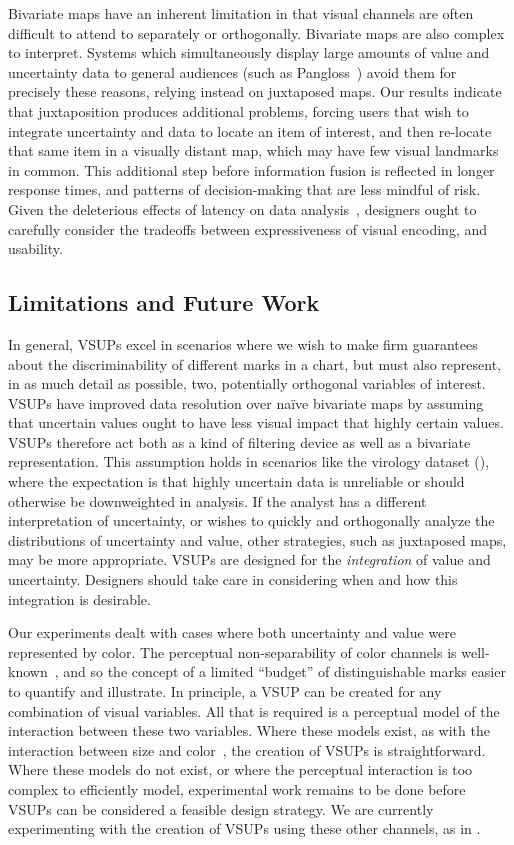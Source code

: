 Bivariate maps have an inherent limitation in that visual channels are often difficult to attend to separately or orthogonally. Bivariate maps are also complex to interpret. Systems which simultaneously display large amounts of value and uncertainty data to general audiences (such as Pangloss~\cite{moritz2017trust}) avoid them for precisely these reasons, relying instead on juxtaposed maps. Our results indicate that juxtaposition produces additional problems, forcing users that wish to integrate uncertainty and data to locate an item of interest, and then re-locate that same item in a visually distant map, which may have few visual landmarks in common. This additional step before information fusion is reflected in longer response times, and patterns of decision-making that are less mindful of risk. Given the deleterious effects of latency on data analysis~\cite{liu2014effects}, designers ought to carefully consider the tradeoffs between expressiveness of visual encoding, and usability.

\subsection{Limitations and Future Work}
In general, VSUPs excel in scenarios where we wish to make firm guarantees about the discriminability of different marks in a chart, but must also represent, in as much detail as possible, two, potentially orthogonal variables of interest. VSUPs have improved data resolution over na\"ive bivariate maps by assuming that uncertain values ought to have less visual impact that highly certain values. VSUPs therefore act both as a kind of filtering device as well as a bivariate representation. This assumption holds in scenarios like the virology dataset (), where the expectation is that highly uncertain data is unreliable or should otherwise be downweighted in analysis. If the analyst has a different interpretation of uncertainty, or wishes to quickly and orthogonally analyze the distributions of uncertainty and value, other strategies, such as juxtaposed maps, may be more appropriate. VSUPs are designed for the \emph{integration} of value and uncertainty. Designers should take care in considering when and how this integration is desirable.

Our experiments dealt with cases where both uncertainty and value were represented by color. The perceptual non-separability of color channels is well-known~\cite{garner1970integrality, ware2012information}, and so the concept of a limited ``budget'' of distinguishable marks easier to quantify and illustrate. In principle, a VSUP can be created for any combination of visual variables. All that is required is a perceptual model of the interaction between these two variables. Where these models exist, as with the interaction between size and color~\cite{stone2014engineering}, the creation of VSUPs is straightforward. Where these models do not exist, or where the perceptual interaction is too complex to efficiently model, experimental work remains to be done before VSUPs can be considered a feasible design strategy. We are currently experimenting with the creation of VSUPs using these other channels, as in .

